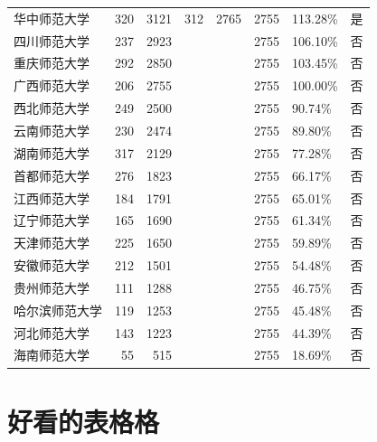 \documentclass[cn, 11pt, fancy, hide]{elegantbook}
\begin{document}
\begin{table}[!h]
\begin{tabular}[t]{lrrrrrll}
华中师范大学 & 320 & 3121 & 312 & 2765 & 2755 & 113.28\% & 是\\
\addlinespace
四川师范大学 & 237 & 2923 &  &  & 2755 & 106.10\% & 否\\
重庆师范大学 & 292 & 2850 &  &  & 2755 & 103.45\% & 否\\
广西师范大学 & 206 & 2755 &  &  & 2755 & 100.00\% & 否\\
西北师范大学 & 249 & 2500 &  &  & 2755 & 90.74\% & 否\\
云南师范大学 & 230 & 2474 &  &  & 2755 & 89.80\% & 否\\
\addlinespace
湖南师范大学 & 317 & 2129 &  &  & 2755 & 77.28\% & 否\\
首都师范大学 & 276 & 1823 &  &  & 2755 & 66.17\% & 否\\
江西师范大学 & 184 & 1791 &  &  & 2755 & 65.01\% & 否\\
辽宁师范大学 & 165 & 1690 &  &  & 2755 & 61.34\% & 否\\
天津师范大学 & 225 & 1650 &  &  & 2755 & 59.89\% & 否\\
\addlinespace
安徽师范大学 & 212 & 1501 &  &  & 2755 & 54.48\% & 否\\
贵州师范大学 & 111 & 1288 &  &  & 2755 & 46.75\% & 否\\
哈尔滨师范大学 & 119 & 1253 &  &  & 2755 & 45.48\% & 否\\
河北师范大学 & 143 & 1223 &  &  & 2755 & 44.39\% & 否\\
海南师范大学 & 55 & 515 &  &  & 2755 & 18.69\% & 否\\
\bottomrule
\end{tabular}
\end{table}

\hypertarget{ux597dux770bux7684ux8868ux683cux683c}{%
\section{好看的表格格}\label{ux597dux770bux7684ux8868ux683cux683c}}
\end{document}
